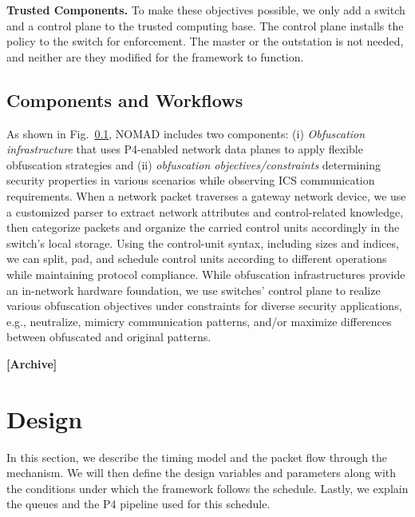 \documentclass[conference]{IEEEtran}
\begin{document}
\textbf{Trusted Components.} To make these objectives possible, we only add a switch and a control plane to the trusted computing base. The control plane installs the policy to the switch for enforcement. The master or the outstation is not needed, and neither are they modified for the framework to function.

\subsection{Components and Workflows}

As shown in Fig.~\ref{}, NOMAD includes two components: (i) \textit{Obfuscation infrastructure} that uses P4-enabled network data planes to apply flexible obfuscation strategies and (ii) \textit{obfuscation objectives/constraints} determining security properties in various scenarios while observing ICS communication requirements. When a network packet traverses a gateway network device, we use a customized parser to extract network attributes and control-related knowledge, then categorize packets and organize the carried control units accordingly in the switch's local storage. Using the control-unit syntax, including sizes and indices, we can split, pad, and schedule control units according to different operations while maintaining protocol compliance. While obfuscation infrastructures provide an in-network hardware foundation, we use switches' control plane to realize various obfuscation objectives under constraints for diverse security applications, e.g., neutralize, mimicry communication patterns, and/or maximize differences between obfuscated and original patterns.  

\textbf{[Archive]}\section{Design}
\label{sec:design}
In this section, we describe the timing model and the packet flow through the mechanism. We will then define the design variables and parameters along with the conditions under which the framework follows  the schedule. Lastly, we explain the queues and the P4 pipeline used for this schedule.
\end{document}
